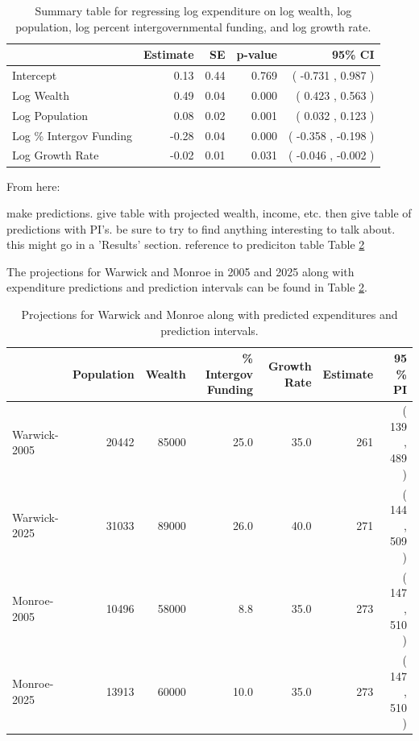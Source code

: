 \documentclass{article}\usepackage[]{graphicx}\usepackage[]{color}
\begin{document}



\begin{table}[ht]
\centering
\begin{tabular}{|l|rrrr|}
  \hline
 & Estimate & SE & p-value & 95\% CI \\ 
  \hline
Intercept & 0.13 & 0.44 & 0.769 & ( -0.731 , 0.987 ) \\ 
  Log Wealth & 0.49 & 0.04 & 0.000 & ( 0.423 , 0.563 ) \\ 
  Log Population & 0.08 & 0.02 & 0.001 & ( 0.032 , 0.123 ) \\ 
  Log \% Intergov Funding & -0.28 & 0.04 & 0.000 & ( -0.358 , -0.198 ) \\ 
  Log Growth Rate & -0.02 & 0.01 & 0.031 & ( -0.046 , -0.002 ) \\ 
   \hline
\end{tabular}
\caption{Summary table for regressing log expenditure on log wealth, log population, log percent intergovernmental funding, and log growth rate.} 
\label{tbl:regress}
\end{table}



From here: 

make predictions. give table with projected wealth, income, etc. then give table of predictions with PI's. be sure to try to find anything interesting to talk about. this might go in a 'Results' section. reference to prediciton table Table \ref{tbl:pred}

The projections for Warwick and Monroe in 2005 and 2025 along with expenditure predictions and prediction intervals can be found in Table \ref{tbl:pred}.

\begin{table}[ht]
\centering
\begin{tabular}{|l|rrrrrr|}
  \hline
 & Population & Wealth & \% Intergov Funding & Growth Rate & Estimate & 95 \% PI \\ 
  \hline
Warwick-2005 & 20442 & 85000 & 25.0 & 35.0 & 261 & ( 139 , 489 ) \\ 
  Warwick-2025  & 31033 & 89000 & 26.0 & 40.0 & 271 & ( 144 , 509 ) \\ 
  Monroe-2005 & 10496 & 58000 & 8.8 & 35.0 & 273 & ( 147 , 510 ) \\ 
  Monroe-2025 & 13913 & 60000 & 10.0 & 35.0 & 273 & ( 147 , 510 ) \\ 
   \hline
\end{tabular}
\caption{Projections for Warwick and Monroe along with predicted expenditures and prediction intervals.} 
\label{tbl:pred}
\end{table}
\end{document}
